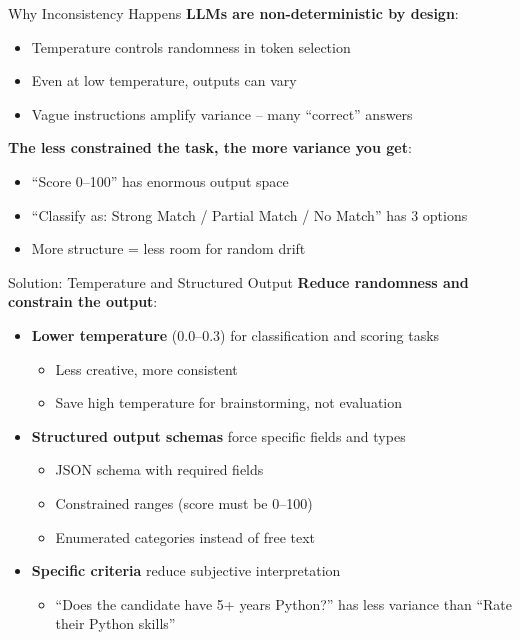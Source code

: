\documentclass[aspectratio=169]{beamer}
\begin{document}
\begin{frame}{Why Inconsistency Happens}
\textbf{LLMs are non-deterministic by design}:
\begin{itemize}
    \item Temperature controls randomness in token selection
    \item Even at low temperature, outputs can vary
    \item Vague instructions amplify variance -- many ``correct'' answers
\end{itemize}
\vspace{0.3cm}

\textbf{The less constrained the task, the more variance you get}:
\begin{itemize}
    \item ``Score 0--100'' has enormous output space
    \item ``Classify as: Strong Match / Partial Match / No Match'' has 3 options
    \item More structure = less room for random drift
\end{itemize}
\end{frame}

\begin{frame}{Solution: Temperature and Structured Output}
\textbf{Reduce randomness and constrain the output}:
\vspace{0.3cm}

\begin{itemize}
    \item \textbf{Lower temperature} (0.0--0.3) for classification and scoring tasks
    \begin{itemize}
        \item Less creative, more consistent
        \item Save high temperature for brainstorming, not evaluation
    \end{itemize}
    \vspace{0.2cm}
    \item \textbf{Structured output schemas} force specific fields and types
    \begin{itemize}
        \item JSON schema with required fields
        \item Constrained ranges (score must be 0--100)
        \item Enumerated categories instead of free text
    \end{itemize}
    \vspace{0.2cm}
    \item \textbf{Specific criteria} reduce subjective interpretation
    \begin{itemize}
        \item ``Does the candidate have 5+ years Python?'' has less variance than ``Rate their Python skills''
    \end{itemize}
\end{itemize}
\end{frame}
\end{document}
